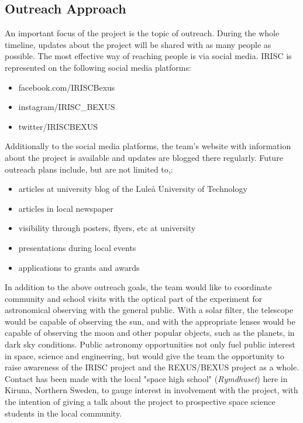 
\subsection{Outreach Approach}
An important focus of the project is the topic of outreach. During the whole timeline, updates about the project will be shared with as many people as possible. The most effective way of reaching people is via social media. IRISC is represented on the following social media platforms:
\begin{itemize}
	\item facebook.com/IRISCBexus
	\item instagram/IRISC\_BEXUS
	\item twitter/IRISCBEXUS
\end{itemize}
Additionally to the social media platforms, the team's website with information about the project is available and updates are blogged there regularly.\newline\newline
Future outreach plans include, but are not limited to,:
\begin{itemize}
	\item articles at university blog of the Lule{\aa} University of Technology
	\item articles in local newspaper
	\item visibility through posters, flyers, etc at university
	\item presentations during local events
	\item applications to grants and awards
\end{itemize}

In addition to the above outreach goals, the team would like to coordinate community and school visits with the optical part of the experiment for astronomical observing with the general public. With a solar filter, the telescope would be capable of observing the sun, and with the appropriate lenses would be capable of observing the moon and other popular objects, such as the planets, in dark sky conditions. Public astronomy opportunities not only fuel public interest in space, science and engineering, but would give the team the opportunity to raise awareness of the IRISC project and the REXUS/BEXUS project as a whole.\\
Contact has been made with the local "space high school" (\textit{Rymdhuset}) here in Kiruna, Northern Sweden, to gauge interest in involvement with the project, with the intention of giving a talk about the project to prospective space science students in the local community. 